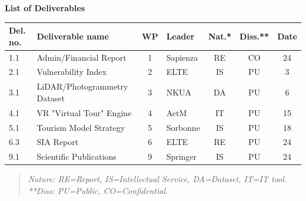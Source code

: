 \medskip
\textbf{List of Deliverables}
\begin{table}[H]
\centering
\scriptsize
\renewcommand{\arraystretch}{1.3}
\begin{tabularx}{\textwidth}{|l|X|c|l|c|c|c|}
\hline
\rowcolor{gray!10} \textbf{Del. no.} & \textbf{Deliverable name} & \textbf{WP} & \textbf{Leader} & \textbf{Nat.*} & \textbf{Diss.**} & \textbf{Date} \\ \hline
1.1 & Admin/Financial Report & 1 & Sapienza & RE & CO & 24 \\ \hline
2.1 & Vulnerability Index & 2 & ELTE & IS & PU & 3 \\ \hline
3.1 & LiDAR/Photogrammetry Dataset & 3 & NKUA & DA & PU & 6 \\ \hline
4.1 & VR "Virtual Tour" Engine & 4 & AetM & IT & PU & 15 \\ \hline
5.1 & Tourism Model Strategy & 5 & Sorbonne & IS & PU & 18 \\ \hline
6.3 & SIA Report & 6 & ELTE & RE & PU & 24 \\ \hline
9.1 & Scientific Publications & 9 & Springer & IS & PU & 24 \\ \hline
\end{tabularx}
\begin{quote}
\textit{\tiny *Nature: RE=Report, IS=Intellectual Service, DA=Dataset, IT=IT tool. **Diss: PU=Public, CO=Confidential.}
\end{quote}
\end{table}
